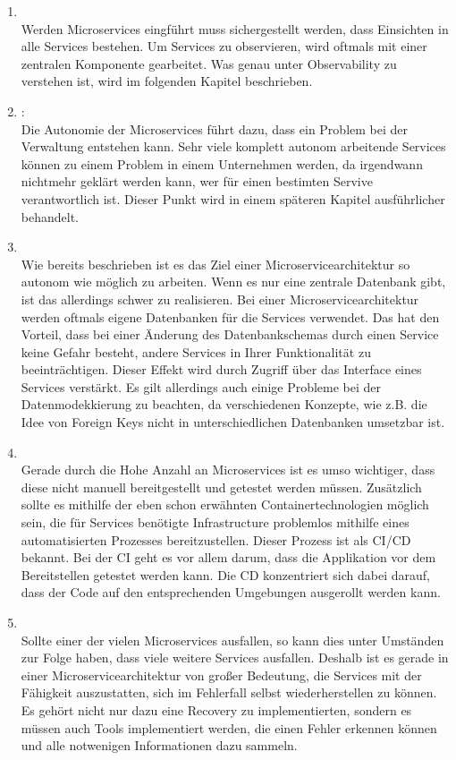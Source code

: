 \begin{definition}
\begin{enumerate}
		\item {}\\
		Werden Microservices eingführt muss sichergestellt werden, dass Einsichten in alle Services bestehen. Um Services zu observieren, wird oftmals mit einer zentralen Komponente gearbeitet. Was genau unter Observability zu verstehen ist, wird im folgenden Kapitel beschrieben.
		\item {}:\\
		Die Autonomie der Microservices führt dazu, dass ein Problem bei der Verwaltung entstehen kann. Sehr viele komplett autonom arbeitende Services können zu einem Problem in einem Unternehmen werden, da irgendwann nichtmehr geklärt werden kann, wer für einen bestimten Servive verantwortlich ist. Dieser Punkt wird in einem späteren Kapitel ausführlicher behandelt.
		\item {}\\
		Wie bereits beschrieben ist es das Ziel einer Microservicearchitektur so autonom wie möglich zu arbeiten. Wenn es nur eine zentrale Datenbank gibt, ist das allerdings schwer zu realisieren. Bei einer Microservicearchitektur werden oftmals eigene Datenbanken für die Services verwendet. Das hat den Vorteil, dass bei einer Änderung des Datenbankschemas durch einen Service keine Gefahr besteht, andere Services in Ihrer Funktionalität zu beeinträchtigen. Dieser Effekt wird durch Zugriff über das Interface eines Services verstärkt. Es gilt allerdings auch einige Probleme bei der Datenmodekkierung zu beachten, da verschiedenen Konzepte, wie z.B. die Idee von Foreign Keys nicht in unterschiedlichen Datenbanken umsetzbar ist.
		\item {}\\
		Gerade durch die Hohe Anzahl an Microservices ist es umso wichtiger, dass diese nicht manuell bereitgestellt und getestet werden müssen. Zusätzlich sollte es mithilfe der eben schon erwähnten Containertechnologien möglich sein, die für Services benötigte Infrastructure problemlos mithilfe eines automatisierten Prozesses bereitzustellen. Dieser Prozess ist als \ac{CI}/\ac{CD} bekannt. Bei der \ac{CI} geht es vor allem darum, dass die Applikation vor dem Bereitstellen getestet werden kann. Die \ac{CD} konzentriert sich dabei darauf, dass der Code auf den entsprechenden Umgebungen ausgerollt werden kann.
		\item {}\\
		Sollte einer der vielen Microservices ausfallen, so kann dies unter Umständen zur Folge haben, dass viele weitere Services ausfallen. Deshalb ist es gerade in einer Microservicearchitektur von großer Bedeutung, die Services mit der Fähigkeit auszustatten, sich im Fehlerfall selbst wiederherstellen zu können. Es gehört nicht nur dazu eine Recovery zu implementierten, sondern es müssen auch Tools implementiert werden, die einen Fehler erkennen können und alle notwenigen Informationen dazu sammeln.
	\end{enumerate}
\end{definition}


